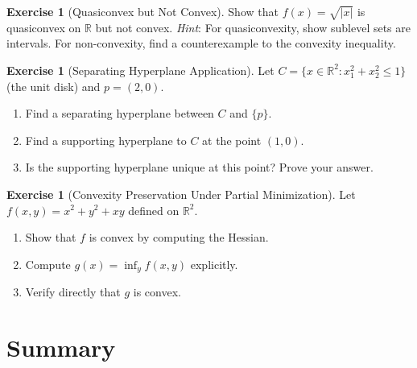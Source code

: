 \documentclass[11pt,a4paper]{article}
\theoremstyle{definition}
\newtheorem{exercise}[theorem]{Exercise}
\theoremstyle{remark}
\newcommand{\R}{\mathbb{R}}
\begin{document}
\begin{exercise}[Quasiconvex but Not Convex]
\label{ex:quasiconvex-not-convex}
Show that $f(x) = \sqrt{|x|}$ is quasiconvex on $\R$ but not convex.
\textit{Hint}: For quasiconvexity, show sublevel sets are intervals. For non-convexity,
find a counterexample to the convexity inequality.
\end{exercise}

\begin{exercise}[Separating Hyperplane Application]
\label{ex:separation-app}
Let $C = \{x \in \R^2 : x_1^2 + x_2^2 \le 1\}$ (the unit disk) and $p = (2, 0)$.
\begin{enumerate}[label=(\alph*)]
  \item Find a separating hyperplane between $C$ and $\{p\}$.
  \item Find a supporting hyperplane to $C$ at the point $(1, 0)$.
  \item Is the supporting hyperplane unique at this point? Prove your answer.
\end{enumerate}
\end{exercise}

\begin{exercise}[Convexity Preservation Under Partial Minimization]
\label{ex:partial-min-exercise}
Let $f(x, y) = x^2 + y^2 + xy$ defined on $\R^2$.
\begin{enumerate}[label=(\alph*)]
  \item Show that $f$ is convex by computing the Hessian.
  \item Compute $g(x) = \inf_y f(x, y)$ explicitly.
  \item Verify directly that $g$ is convex.
\end{enumerate}
\end{exercise}

\section{Summary}
\end{document}
